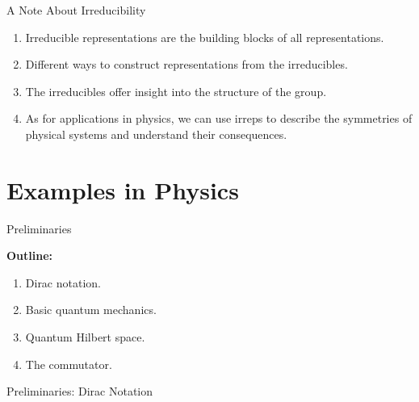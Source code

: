 \documentclass[compress,aspectratio=169,10pt,usenames,dvipsnames]{beamer}
\begin{document}

\begin{frame}{A Note About Irreducibility}

\begin{enumerate}
  \item Irreducible representations are the building blocks of all representations.
  \item Different ways to construct representations from the irreducibles.
  \item The irreducibles offer insight into the structure of the group.
  \item As for applications in physics, we can use irreps to describe the symmetries of physical systems and understand their consequences.
\end{enumerate}

\end{frame}



\section{Examples in Physics}
\begin{frame}
  \sectionpage
\end{frame}


\begin{frame}{Preliminaries}

\textbf{Outline:}
\begin{enumerate}
  \item Dirac notation.
  \item Basic quantum mechanics.
  \item Quantum Hilbert space.
  \item The commutator.
\end{enumerate}

\end{frame}


\begin{frame}{Preliminaries: Dirac Notation}



\end{frame}
\end{document}
